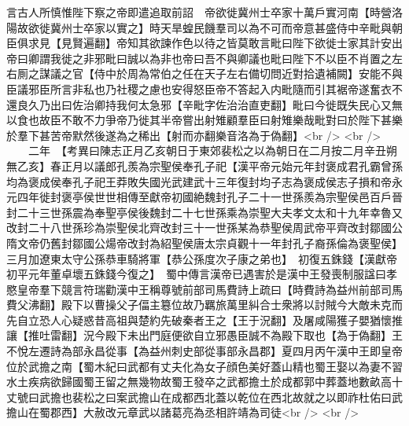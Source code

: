 言古人所慎惟陛下察之帝即遣追取前詔　帝欲徙冀州士卒家十萬戶實河南【時營洛陽故欲徙冀州士卒家以實之】時天旱蝗民饑羣司以為不可而帝意甚盛侍中辛毗與朝臣俱求見【見賢遍翻】帝知其欲諫作色以待之皆莫敢言毗曰陛下欲徙士家其計安出帝曰卿謂我徙之非邪毗曰誠以為非也帝曰吾不與卿議也毗曰陛下不以臣不肖置之左右厠之謀議之官【侍中於周為常伯之任在天子左右備切問近對拾遺補闕】安能不與臣議邪臣所言非私也乃社稷之慮也安得怒臣帝不答起入内毗隨而引其裾帝遂奮衣不還良久乃出曰佐治卿持我何太急邪【辛毗字佐治治直吏翻】毗曰今徙既失民心又無以食也故臣不敢不力爭帝乃徙其半帝嘗出射雉顧羣臣曰射雉樂哉毗對曰於陛下甚樂於羣下甚苦帝默然後遂為之稀出【射而亦翻樂音洛為于偽翻】<br />
<br />
　　二年　【考異曰陳志正月乙亥朝日于東郊裴松之以為朝日在二月按二月辛丑朔無乙亥】春正月以議郎孔羨為宗聖侯奉孔子祀【漢平帝元始元年封褒成君孔霸曾孫均為褒成侯奉孔子祀王莽敗失國光武建武十三年復封均子志為褒成侯志子損和帝永元四年徙封褒亭侯世世相傳至獻帝初國絶魏封孔子二十一世孫羨為宗聖侯邑百戶晉封二十三世孫震為奉聖亭侯後魏封二十七世孫乘為崇聖大夫孝文太和十九年幸魯又改封二十八世孫珍為崇聖侯北齊改封三十一世孫某為恭聖侯周武帝平齊改封鄒國公隋文帝仍舊封鄒國公煬帝改封為紹聖侯唐太宗貞觀十一年封孔子裔孫倫為褒聖侯】　三月加遼東太守公孫恭車騎將軍【恭公孫度次子康之弟也】　初復五銖錢【漢獻帝初平元年董卓壞五銖錢今復之】　蜀中傳言漢帝已遇害於是漢中王發喪制服諡曰孝愍皇帝羣下競言符瑞勸漢中王稱尊號前部司馬費詩上疏曰【時費詩為益州前部司馬費父沸翻】殿下以曹操父子偪主簒位故乃羈旅萬里糾合士衆將以討賊今大敵未克而先自立恐人心疑惑昔高祖與楚約先破秦者王之【王于況翻】及屠咸陽獲子嬰猶懷推讓【推吐雷翻】況今殿下未出門庭便欲自立邪愚臣誠不為殿下取也【為于偽翻】王不悅左遷詩為部永昌從事【為益州刺史部從事部永昌郡】夏四月丙午漢中王即皇帝位於武擔之南【蜀木紀曰武都有丈夫化為女子顔色美好蓋山精也蜀王娶以為妻不習水土疾病欲歸國蜀王留之無幾物故蜀王發卒之武都擔土於成都郭中葬蓋地數畝高十丈號曰武擔也裴松之曰案武擔山在成都西北蓋以乾位在西北故就之以即祚杜佑曰武擔山在蜀郡西】大赦改元章武以諸葛亮為丞相許靖為司徒<br />
<br />
